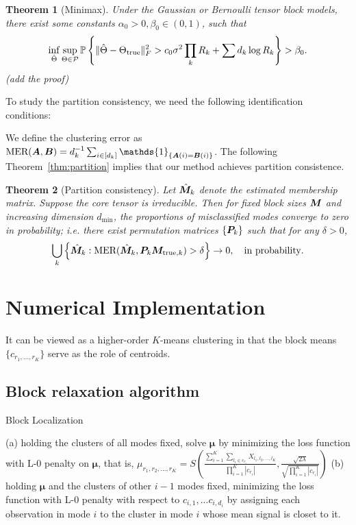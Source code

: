 \documentclass{article}
\newtheorem{theorem}{Theorem}
\begin{document}
\begin{theorem}[Minimax] Under the Gaussian or Bernoulli tensor block models, there exist some constants $\alpha_0>0, \beta_0\in(0,1)$, such that
\[
\inf_{\hat \Theta}\sup_{\Theta \in \mathcal{P}}\mathbb{P}\left\{ \lVert\hat \Theta-\Theta_{\text{true}}\rVert_F^2> c_0\sigma^2 \prod_k R_k+\sum d_k \log R_k\right\}>\beta_0.
\]
(add the proof)
\end{theorem}

To study the partition consistency, we need the following identification conditions:


We define the clustering error as $\text{MER}(\mA, \mB)=d_k^{-1}\sum_{i\in[d_k]}\mathds{1}_{\{\mA(i)=\mB(i)\}}$. The following Theorem~\eqref{thm:partition} implies that our method achieves partition consistence. 
\begin{theorem}[Partition consistency]\label{thm:partition}
Let $\hat {\bm M}_k$ denote the estimated membership matrix. Suppose the core tensor is irreducible. Then for fixed block sizes $\bm M$ and increasing dimension $d_{\text{min}}$, the proportions of misclassified modes converge to zero in probability; i.e. there exist permutation matrices $\{\bm{P}_k\}$ such that for any $\delta>0$,
\[
\bigcup_k\left\{ \hat{\bm M}_k: \text{MER}(\hat {\bm M}_k, \bm{P}_k\bm M_{\text{true},k})> \delta\right\} \rightarrow 0, \quad \text{in probability}.
\]
\end{theorem}

\section{Numerical Implementation}
It can be viewed as a higher-order $K$-means clustering in that the block means $\{c_{r_1,\ldots,r_K}\}$ serve as the role of centroids. 

\subsection{Block relaxation algorithm}
	\begin{algorithm}
		\caption{Block Localization}
		\label{alg:B}
		\begin{algorithmic}
			\REPEAT 
			\STATE (a) holding the clusters of all modes fixed, solve $\bm{\mu}$ by minimizing the loss function with L-0 penalty on $\bm{\mu}$, that is,
			$\mu_{r_1,r_2,...,r_K} = S(\frac{\sum_{i=1}^K\sum_{l_i\in c_{r_i}}X_{l_1,l_2,...,l_K}}{\prod_{i=1}^{K}|c_{r_i}|},\frac{\sqrt{2\lambda}}{\sqrt{\prod_{i=1}^{K}|c_{r_i}|}})$
			\STATE (b) holding  $\bm{\mu}$ and the clusters of other $i-1$ modes fixed, minimizing the loss function with L-0 penalty with respect to $c_{i,1},...c_{i,d_i}$ by assigning each observation in mode $i$ to the cluster in mode $i$ whose mean signal is closet to it.
		\ENDFOR
		\end{algorithmic}
	\end{algorithm}
	
\end{document}
